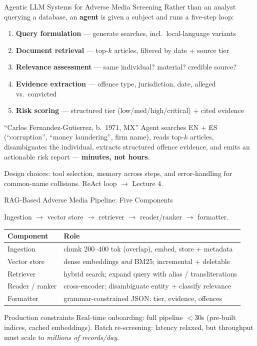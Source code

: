 \documentclass[9pt,t]{beamer}
\begin{document}
\begin{frame}{Agentic LLM Systems for Adverse Media Screening}
Rather than an analyst querying a database, an \textbf{agent} is given a subject
and runs a five-step loop:

\medskip
\begin{enumerate}
  \item \textbf{Query formulation} --- generate searches, incl.\ local-language variants
  \item \textbf{Document retrieval} --- top-$k$ articles, filtered by date + source tier
  \item \textbf{Relevance assessment} --- same individual? material? credible source?
  \item \textbf{Evidence extraction} --- offence type, jurisdiction, date, alleged vs.\ convicted
  \item \textbf{Risk scoring} --- structured tier (low/med/high/critical) + cited evidence
\end{enumerate}

\medskip
\begin{exampleblock}{``Carlos Fernandez-Gutierrez, b.\ 1971, MX''}
Agent searches EN + ES (``corruption'', ``money laundering'', firm name), reads
top-$k$ articles, disambiguates the individual, extracts structured offence
evidence, and emits an actionable risk report --- \textbf{minutes, not hours}.
\end{exampleblock}

\footnotesize Design choices: tool selection, memory across steps, and
error-handling for common-name collisions. ReAct loop $\to$ Lecture 4.
\end{frame}

\begin{frame}{RAG-Based Adverse Media Pipeline: Five Components}
\begin{underhood}
Ingestion $\to$ vector store $\to$ retriever $\to$ reader/ranker $\to$ formatter.
\end{underhood}

\medskip
\begin{tabular}{ll}
\toprule
\textbf{Component} & \textbf{Role} \\
\midrule
Ingestion & chunk 200--400 tok (overlap), embed, store + metadata \\
Vector store & dense embeddings \emph{and} BM25; incremental + deletable \\
Retriever & hybrid search; expand query with alias / transliterations \\
Reader / ranker & cross-encoder: disambiguate entity + classify relevance \\
Formatter & grammar-constrained JSON: tier, evidence, offences \\
\bottomrule
\end{tabular}

\medskip
\begin{block}{Production constraints}
Real-time onboarding: full pipeline $<$30s (pre-built indices, cached
embeddings). Batch re-screening: latency relaxed, but throughput must scale to
\emph{millions of records/day}.
\end{block}
\end{frame}
\end{document}
